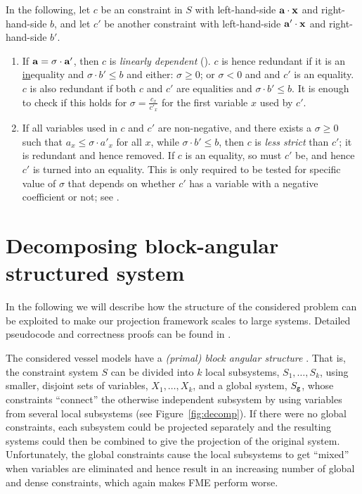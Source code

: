 In the following, let $c$ be an constraint in $S$ with left-hand-side $\mathbf{a}\cdot \mathbf{x}$ and right-hand-side $b$, and let $c'$ be another constraint with left-hand-side $\mathbf{a}'\cdot \mathbf{x}$ and right-hand-side $b'$. 
\begin{enumerate} \itemsep0em
\setcounter{enumi}{\value{counterName}}
\item 
If $\mathbf{a}=\sigma\cdot \mathbf{a}'$, then $c$ is \emph{linearly dependent} (\cite{lassez93}). $c$ is hence redundant if
it is an \underline{in}equality and $\sigma\cdot b'\leq b$ and either: $\sigma\geq 0$; or $\sigma<0$ and and $c'$ is an equality. $c$ is also redundant if both $c$ and $c'$ are equalities and $\sigma\cdot b'\leq b$. 
It is enough to check if this holds for $\sigma = \frac{c_x}{c'_x}$ for the first variable $x$ used by $c'$.
\item
If all variables used in $c$ and $c'$ are non-negative, and there exists a $\sigma\geq 0$ such that $a_x \leq \sigma \cdot a'_x$ for all $x$, while $\sigma\cdot b' \leq b$, then $c$ is \emph{less strict} than $c'$; it is redundant and hence removed. If $c$ is an equality, so must $c'$ be, and hence $c'$ is turned into an equality. 
This is only required to be tested for specific value of $\sigma$ that depends on whether $c'$ has a variable with a negative coefficient or not; see \cite{MyTechRep}.
\end{enumerate} 

\section{Decomposing block-angular structured system}
\label{sec:decomp}
In the following we will describe how the structure of the considered problem can be exploited to make our projection framework scales to large systems. Detailed pseudocode and correctness proofs can be found in \cite{MyTechRep}. 

The considered vessel models have a \emph{(primal) block angular structure} \cite{williams}. That is, the constraint system $S$ can be divided into $k$ local subsystems, $S_1, \ldots, S_k$, using smaller, disjoint sets of variables, $X_1, \ldots, X_k$, and a global system, $S_{\texttt{g}}$, whose constraints ``connect'' the otherwise independent subsystem by using variables from several local subsystems (see Figure~\ref{fig:decomp}). 
%
If there were no global constraints, each subsystem could be projected separately and the resulting systems could then be combined to give the projection of the original system. 
Unfortunately, the global constraints cause the local subsystems to get ``mixed'' when variables are eliminated and hence result in an increasing number of global and dense constraints, which again makes FME perform worse.

